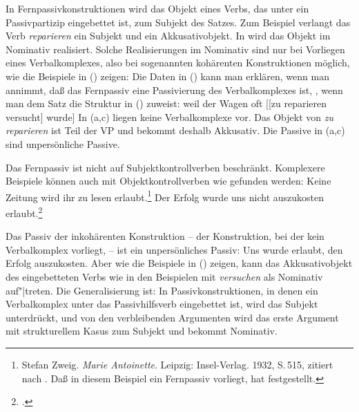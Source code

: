In Fernpassivkonstruktionen wird das Objekt eines Verbs, das unter ein Passivpartizip eingebettet ist,
zum Subjekt des Satzes. Zum Beispiel verlangt das Verb \emph{reparieren} ein Subjekt und ein Akkusativobjekt.
In  wird das Objekt im Nominativ realisiert.
Solche Realisierungen im Nominativ sind nur bei Vorliegen eines Verbalkomplexes, also bei sogenannten
kohärenten Konstruktionen möglich, wie die Beispiele in () zeigen:
\eal
{}
\zl
Die Daten in () kann man erklären, wenn man annimmt, daß das Fernpassiv eine Passivierung
des Verbalkomplexes ist, \dash, wenn man dem Satz 
die Struktur in () zuweist:
\ea
weil    der Wagen     oft   [[zu reparieren versucht] wurde]
%
\z
In (a,c) liegen keine Verbalkomplexe vor. Das Objekt von \emph{zu reparieren} ist Teil der VP
und bekommt deshalb Akkusativ. Die Passive in (a,c) sind unpersönliche Passive.

Das Fernpassiv ist nicht auf Subjektkontrollverben beschränkt. Komplexere Beispiele
können auch mit Objektkontrollverben wie  gefunden werden:
\eal
\label{bsp-auskosten-fernpassiv}
\ex{}
Keine Zeitung         wird ihr       zu lesen erlaubt.\footnote{
        Stefan Zweig. \emph{Marie Antoinette}. Leipzig: Insel-Verlag. 1932, S.\,515, 
        zitiert nach . 
        Daß in diesem Beispiel ein Fernpassiv vorliegt, hat \citet[]{Askedal88} festgestellt.
}
\ex{}
Der Erfolg        wurde uns      nicht auszukosten erlaubt.\footnote{
        .%
}
\label{bsp-auskosten-fernpassiv-haider}
\zl

\noindent
Das Passiv der inkohärenten Konstruktion -- der Konstruktion, 
bei der kein Verbalkomplex vorliegt, -- ist ein unpersönliches Passiv:
\eas
Uns wurde erlaubt, den Erfolg auszukosten.
\zs
Aber wie die Beispiele in () zeigen, kann das Akkusativobjekt des eingebetteten Verbs
wie in den Beispielen mit \emph{versuchen} als Nominativ auf"|treten.
Die Generalisierung ist: In Passivkonstruktionen, in denen ein Verbalkomplex unter das Passivhilfsverb
eingebettet ist, wird das Subjekt unterdrückt, und von den verbleibenden Argumenten
wird das erste Argument mit strukturellem Kasus
zum Subjekt und bekommt Nominativ.%

